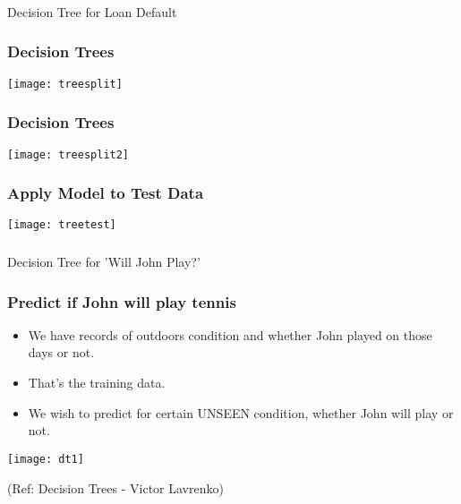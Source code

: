 \begin{frame}[fragile]\frametitle{}
\begin{center}
{\Large Decision Tree for Loan Default}
\end{center}
\end{frame}


\begin{frame}[fragile]\frametitle{Decision Trees}
\begin{center}
\texttt{[image: treesplit]}
\end{center}
\end{frame}

\begin{frame}[fragile]\frametitle{Decision Trees}
\begin{center}
\texttt{[image: treesplit2]}
\end{center}
\end{frame}

\begin{frame}[fragile]\frametitle{Apply Model to Test Data}
\begin{center}
\texttt{[image: treetest]}
\end{center}
\end{frame}

\begin{frame}[fragile]\frametitle{}
\begin{center}
{\Large Decision Tree for 'Will John Play?'}
\end{center}
\end{frame}


\begin{frame}[fragile]\frametitle{Predict if John will play tennis}

\begin{itemize}
\item We have records of outdoors condition and whether John played on those days or not. 
\item That's the training data.
\item We wish to predict for certain UNSEEN condition, whether John will play or not.
\end{itemize}
\begin{center}
\texttt{[image: dt1]}
\end{center}
\tiny{(Ref: Decision Trees - Victor Lavrenko)}
\end{frame}

